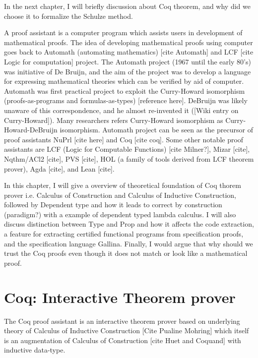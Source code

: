 In the next chapter, I will  briefly discussion about Coq theorem, and why did we choose it 
to formalize the Schulze method.


A proof assistant is a computer program which assists users in development of mathematical proofs. The idea of 
developing mathematical proofs using computer goes back to Automath (automating mathematics)
[cite Automath] and LCF [cite Logic for computation] project. The 
Automath project (1967 until the early 80's)  was initiative of De Bruijn, and the aim of the project was to develop
a language for expressing mathematical theories which can be verified by aid of computer.  Automath was first 
practical project to exploit the Curry-Howard isomorphism (proofs-as-programs and formulas-as-types)
 [reference here]. DeBruijn  was likely unaware of this correspondence, and he almost re-invented it 
 ([Wiki entry on Curry-Howard]). Many researchers refers Curry-Howard isomorphism as 
 Curry-Howard-DeBruijn isomorphism. Automath project can be seen as the precursor of
 proof assistants NuPrl [cite here] and Coq [cite coq].   Some other notable  proof assistants are 
 LCF (Logic for Computable Functions)  [cite Milner?], Mizar [cite], Nqthm/ACl2 [cite], PVS [cite], 
 HOL (a family of tools derived from LCF theorem prover), Agda [cite], and Lean [cite].


In this chapter, I will give a overview of theoretical foundation of 
Coq thorem prover i.e. Calculus of Construction and  
Calculus of Inductive Construction, followed by Dependent type 
and how it leads to 
correct by construction (paradigm?) with a example of dependent 
typed lambda calculus. I will also discuss distinction between Type and Prop 
and how it affects the code extraction, a feature for extracting 
certified functional programs from specification proofs, and the 
specification language Gallina. Finally, I would 
argue that why should we trust the Coq proofs even though it does not 
match or look like a mathematical proof.




\section{Coq: Interactive Theorem prover}
\label{sec:problemstatement}
The Coq proof assistant  is an interactive theorem prover based on
underlying theory of Calculus of 
Inductive Construction [Cite Pualine Mohring]  which itself is an 
augmentation of Calculus of Construction 
[cite Huet and Coquand] with inductive data-type.  
 

